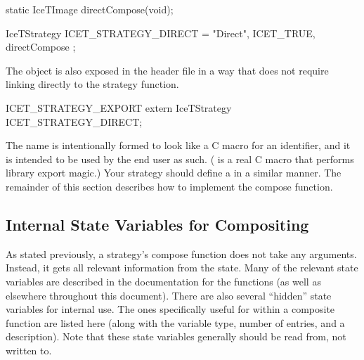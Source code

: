 \begin{code}
static IceTImage directCompose(void);

IceTStrategy ICET_STRATEGY_DIRECT = { "Direct", ICET_TRUE, directCompose };
\end{code}

The object is also exposed in the
 header file in a way
that does not require linking directly to the strategy function.
\begin{code}
ICET_STRATEGY_EXPORT extern IceTStrategy ICET_STRATEGY_DIRECT;
\end{code}

The  name is intentionally formed to look
like a C macro for an identifier, and it is intended to be used by the end
user as such.  ( is a real C macro that
performs library export magic.)  Your strategy should define a
 in a similar manner.  The remainder of this section
describes how to implement the compose function.

\subsection{Internal State Variables for Compositing}

As stated previously, a strategy's compose function does not take any
arguments.  Instead, it gets all relevant information from the \IceT state.
Many of the relevant state variables are described in the documentation for
the  functions (as well as elsewhere throughout this
document).  There are also several ``hidden'' state variables for internal
use.  The ones specifically useful for within a composite function are
listed here (along with the variable type, number of entries, and a
description).  Note that these state variables generally should be read
from, not written to.

